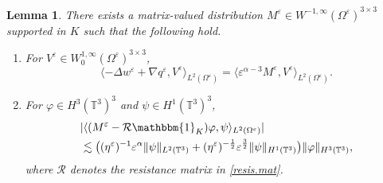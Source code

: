 \documentclass[11pt,a4paper]{article}
\numberwithin{equation}{section}
\newtheorem{lemma}[theorem]{Lemma}
\newcommand{\T}{\mathbb{T}}
\newcommand{\eps}{\varepsilon}
\begin{document}
\begin{lemma}\label{lem.Corr2}
There exists a matrix-valued distribution $M^\eps\in W^{-1,\infty}(\Omega^\eps)^{3\times3}$ supported in $K$ such that the following hold.
\begin{enumerate}[(1)]
\item\label{item1.lem.Corr2}
For $V^\eps\in W^{1,\infty}_0(\Omega^\eps)^{3\times3}$, 
\begin{equation}\label{est.item1.lem.Corr2}
    \langle
    -\Delta w^\eps + \nabla q^\eps, V^\eps
    \rangle_{L^2(\Omega^\eps)}
    = 
    \langle
    \eps^{\alpha-3} M^\eps, V^\eps
    \rangle_{L^2(\Omega^\eps)}.
\end{equation}


\item\label{item2.lem.Corr2}
For $\varphi\in H^3(\T^3)^3$ and $\psi\in H^1(\T^3)^3$, 
\begin{equation}\label{est.item2.lem.Corr2}
    \begin{split}
    &|\langle
    (M^\eps - \mathcal{R} \mathbbm{1}_{K})\varphi, \psi
    \rangle_{L^2(\Omega^\eps)}| \\
    &\lesssim 
    \big(
    (\eta^\eps)^{-1} \eps^\alpha \|\psi\|_{L^2(\T^3)}
    + (\eta^\eps)^{-\frac12} \eps^{\frac32} \|\psi\|_{H^1(\T^3)}
    \big)
    \|\varphi\|_{H^3(\T^3)},
    \end{split}
\end{equation}
where $\mathcal{R}$ denotes the resistance matrix in \eqref{resis.mat}.
\end{enumerate}
\end{lemma}
\end{document}
